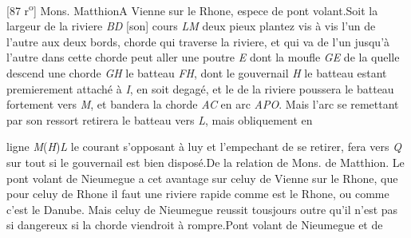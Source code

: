         \vspace*{8mm}
        \pstart 
        \normalsize
      [87 r\textsuperscript{o}] Mons. Matthion\protect{}\pend \pstart A Vienne sur le Rhone\protect{}, espece de pont volant\protect{}.\pend \pstart Soit la largeur de la riviere \textit{BD} [son] cours \textit{LM} deux pieux  plantez vis \`{a} vis l'un de l'autre aux deux bords, chorde  qui traverse la riviere, et qui va de l'un jusqu'\`{a} l'autre dans cette chorde peut aller une poutre \textit{E} dont la moufle \textit{GE} de la quelle descend une chorde \textit{GH}  le batteau\protect{} \textit{FH}, dont le gouvernail \textit{H} le batteau\protect{} estant premierement attach\'{e} \`{a} \textit{I}, en soit degag\'{e}, et   le  de la riviere poussera le batteau\protect{} fortement vers \textit{M}, et bandera la chorde \textit{AC} en arc \textit{APO}. Mais l'arc se remettant par son ressort retirera le batteau\protect{} vers \textit{L}, mais obliquement en\rule[0mm]{0mm}{-10mm} ligne \textit{M}(\textit{H})\textit{L} le courant s'opposant \`{a} luy et l'empechant de se retirer, fera  vers \textit{Q} sur tout si le gouvernail est bien dispos\'{e}.\pend \pstart De la relation de Mons. de Matthion\protect{}. \pend \pstart Le pont volant\protect{} de Nieumegue\protect{} a cet avantage sur celuy de Vienne sur le Rhone\protect{}, que pour celuy de Rhone\protect{} il faut une riviere rapide comme est le Rhone\protect{}, ou comme c'est le Danube\protect{}. Mais celuy de Nieumegue\protect{} reussit tousjours outre qu'il n'est pas si dangereux si la chorde viendroit \`{a} rompre.\pend \pstart Pont volant de Nieumegue\protect{} et de 
